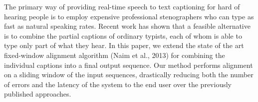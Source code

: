 The primary way of providing real-time speech to text captioning for hard of hearing people is to employ expensive professional stenographers who can type as fast as natural speaking rates. Recent work has shown that a feasible alternative is to combine the partial captions of ordinary typists, each of whom is able to type only part of what they hear. In this paper, we extend the state of the art fixed-window alignment algorithm (Naim et al., 2013) for combining the individual captions into a final output sequence. Our method performs alignment on a sliding window of the input sequences, drastically reducing both the number of errors and the latency of the system to the end user over the previously published approaches.

